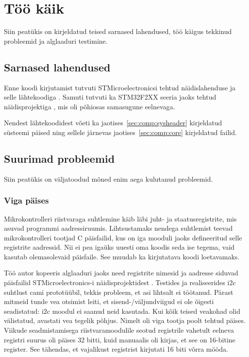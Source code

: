 \documentclass[12pt,a4paper]{article}
\begin{document}
\section{Töö käik}
Siin peatükis on kirjeldatud teised sarnased lahendused, töö käigus tekkinud
probleemid ja alglaaduri testimine.
\subsection{Sarnased lahendused}
Enne koodi kirjutamist tutvuti STMicroelectronicsi tehtud näidislahenduse ja
selle lähtekoodiga \cite{f1IAP}. Samuti tutvuti ka STM32F2XX seeria jaoks tehtud
näidisprojektiga \cite{f2IAP}, mis oli põhiosas samasugune eelnevaga.

Nendest lähtekoodidest võeti ka jaotises~\ref{sec:comp:sysheader} kirjeldatud
süsteemi päised ning sellele järnevas jaotises~\ref{sec:comp:core}
kirjeldatud failid.

\subsection{Suurimad probleemid}
Siin peatükis on väljatoodud mõned enim aega kulutanud probleemid.
\subsubsection{Viga päises}
Mikrokontrolleri riistvaraga suhtlemine käib läbi juht- ja staatusregistrite,
mis asuvad programmi aadressiruumis. Lihtsustamaks nendega suhtlemist teevad
mikrokontrolleri tootjad C päisfailid, kus on iga mooduli jaoks defineeritud
selle registrite aadressid. Nii ei pea igaüks uuesti oma koodis seda ise tegema,
vaid kasutab olemasolevaid päisfaile. See muudab ka kirjutatava koodi
loetavamaks.

Töö autor kopeeris alglaaduri jaoks need registrite nimesid ja aadresse siduvad
päisfailid STMicroelectronics-i näidisprojektidest \cite{f1IAP,f2IAP}. Testides ja
realiseerides \gls{i2c} suhtlust \gls{cam}i prototüübil, tekkis probleem, et
asi lihtsalt ei töötanud. Pärast mitmeid tunde vea otsimist leiti, et
sisend-/väljundviigud ei ole õigesti seadistatud: \gls{i2c} moodul ei saanud neid
kasutada. Kui kõik teised veakohad olid välistatud, avastati vea tegelik põhjus.
Nimelt oli viga tootja poolt tehtud päises. Viikude seadmistamisega
riistvaramoodulile seotud registrile vahetult eelneva registri suurus oli päises
32 bitti, kuid manuaalis oli kirjas, et see on 16-bitine register. See tähendas,
et vajalikust registrist kirjutati 16 biti võrra mööda.
\end{document}
